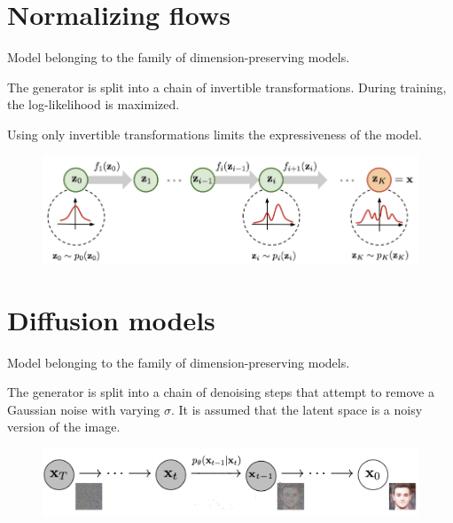 \section{Normalizing flows}

Model belonging to the family of dimension-preserving models.

The generator is split into a chain of invertible transformations.
During training, the log-likelihood is maximized.

\begin{remark}
    Using only invertible transformations limits the expressiveness of the model.
\end{remark}

\begin{figure}[H]
    \centering
    \includegraphics[width=0.65\linewidth]{./img/normalizing_flow.png}
\end{figure}



\section{Diffusion models}

Model belonging to the family of dimension-preserving models.

The generator is split into a chain of denoising steps that attempt to remove a Gaussian noise with varying $\sigma$.
It is assumed that the latent space is a noisy version of the image.

\begin{figure}[H]
    \centering
    \includegraphics[width=0.65\linewidth]{./img/diffusion_model.png}
\end{figure}